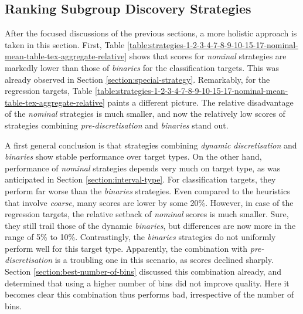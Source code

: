 \documentclass[smallextended]{svjour3}
\newcommand{\parameter}{\emph}
\newcommand{\dyndis}{\parameter{dynamic discretisation}}
\newcommand{\predis}{\parameter{pre-discretisation}}
\newcommand{\binaries}{\parameter{binaries}}
\newcommand{\nominal}{\parameter{nominal}}
\newcommand{\coarse}{\parameter{coarse}}
\begin{document}
\subsection{Ranking Subgroup Discovery Strategies}
\label{section:ranking-subgroup-discovery-strategies}

After the focused discussions of the previous sections, a more holistic approach is taken in this section.
First, Table \ref{table:strategies-1-2-3-4-7-8-9-10-15-17-nominal-mean-table-tex-aggregate-relative} shows that scores for \nominal{} strategies are markedly lower than those of \binaries{} for the classification targets.
This was already observed in Section \ref{section:special-strategy}.
Remarkably, for the regression targets, Table \ref{table:strategies-1-2-3-4-7-8-9-10-15-17-nominal-mean-table-tex-aggregate-relative} paints a different picture.
The relative disadvantage of the \nominal{} strategies is much smaller, and now the relatively low scores of strategies combining \predis{} and \binaries{} stand out.

A first general conclusion is that strategies combining \dyndis{} and \binaries{} show stable performance over target types.
On the other hand, performance of \nominal{} strategies depends very much on target type, as was anticipated in Section \ref{section:interval-type}.
For classification targets, they perform far worse than the \binaries{} strategies.
Even compared to the heuristics that involve \coarse{}, many scores are lower by some 20\%.
However, in case of the regression targets, the relative setback of \nominal{} scores is much smaller.
Sure, they still trail those of the dynamic \binaries{}, but differences are now more in the range of 5\% to 10\%.
Contrastingly, the \binaries{} strategies do not uniformly perform well for this target type.
Apparently, the combination with \predis{} is a troubling one in this scenario, as scores declined sharply.
Section \ref{section:best-number-of-bins} discussed this combination already, and determined that using a higher number of bins did not improve quality.
Here it becomes clear this combination thus performs bad, irrespective of the number of bins.
\end{document}

